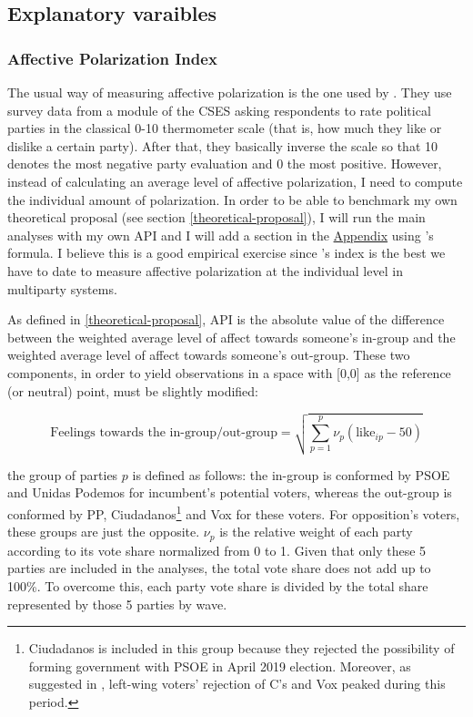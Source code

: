 \documentclass[a4paper, svgnames]{article}
\newcommand{\citeposs}[1]{\citeauthor{#1}'s \citeyearpar{#1}}
\begin{document}
\subsection{Explanatory varaibles}

\subsubsection{Affective Polarization Index}

The usual way of measuring affective polarization is the one used by \cite{Gidron2018}. They use survey data from a module of the CSES asking respondents to rate political parties in the classical 0-10 thermometer scale (that is, how much they like or dislike a certain party). After that, they basically inverse the scale so that 10 denotes the most negative party evaluation and 0 the most positive. However, instead of calculating an average level of affective polarization, I need to compute the individual amount of polarization. In order to be able to benchmark my own theoretical proposal (see section \ref{theoretical-proposal}), I will run the main analyses with my own API and I will add a section in the \hyperref[appendix]{Appendix} using \citet{Wagner2021}'s formula. I believe this is a good empirical exercise since \citeposs{Wagner2021} index is the best we have to date to measure affective polarization at the individual level in multiparty systems.

As defined in \ref{theoretical-proposal}, API is the absolute value of the difference between the weighted average level of affect towards someone's in-group and the weighted average level of affect towards someone's out-group. These two components, in order to yield observations in a space with [0,0] as the reference (or neutral) point, must be slightly modified:

$$
	\text{Feelings towards the in-group/out-group} = \sqrt{\sum^p_{p=1}\nu_p(\text{like}_{ip}-50)}
$$

the group of parties $p$ is defined as follows: the in-group is conformed by PSOE and Unidas Podemos for incumbent's potential voters, whereas the out-group is conformed by PP, Ciudadanos\footnote{Ciudadanos is included in this group because they rejected the possibility of forming government with PSOE in April 2019 election. Moreover, as suggested in \citet*{Orriols2020}, left-wing voters' rejection of C's and Vox peaked during this period.} and Vox for these voters. For opposition's voters, these groups are just the opposite. $\nu_p$ is the relative weight of each party according to its vote share normalized from 0 to 1. Given that only these 5 parties are included in the analyses, the total vote share does not add up to 100\%. To overcome this, each party vote share is divided by the total share represented by those 5 parties by wave.
\end{document}
